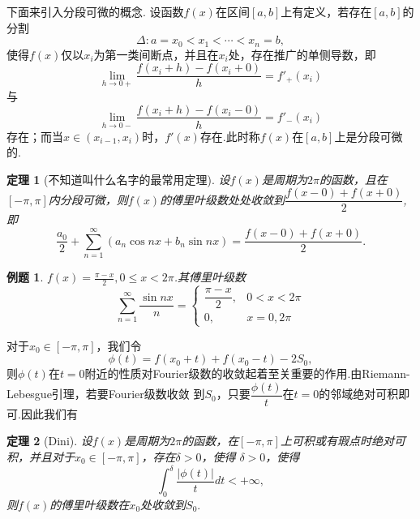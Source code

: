 \documentclass[UTF8]{article}
\newtheorem{thm}{\hspace{2em}定理}[section]
\newtheorem{exa}{\hspace{2em}例题}[section]
\begin{document}
  下面来引入分段可微的概念.
  设函数$f(x)$在区间$[a,b]$上有定义，若存在$[a,b]$的分割
  $$\Delta:a=x_0<x_1<\cdots<x_n=b,$$
  使得$f(x)$仅以$x_i$为第一类间断点，并且在$x_i$处，存在推广的单侧导数，即
  $$\lim_{h\to0+}\frac{f(x_i+h)-f(x_i+0)}{h}=f'_+(x_i)$$与
  $$\lim_{h\to0-}\frac{f(x_i+h)-f(x_i-0)}{h}=f'_-(x_i)$$
  存在；而当$x\in(x_{i-1},x_i)$时，$f'(x)$存在.此时称$f(x)$在$[a,b]$上是分段可微的.
  \begin{thm}[不知道叫什么名字的最常用定理]
    设$f(x)$是周期为$2\pi$的函数，且在$[-\pi,\pi]$内分段可微，则$f(x)$的傅里叶级数处处收敛到$\dfrac{f(x-0)+f(x+0)}{2}$,
    即$$\frac{a_0}{2}+\sum_{n=1}^\infty(a_n\cos nx+b_n\sin nx)=\dfrac{f(x-0)+f(x+0)}{2}.$$
  \end{thm}

  \begin{exa}
    $f(x)=\frac{\pi-x}{2},0\le x<2\pi$.其傅里叶级数
    $$\sum_{n=1}^\infty\frac{\sin nx}{n}=\begin{cases}\dfrac{\pi-x}{2},& 0<x<2\pi\\0,&x=0,2\pi \end{cases}$$
  \end{exa}

  对于$x_0\in[-\pi,\pi]$，我们令
  $$\phi(t)=f(x_0+t)+f(x_0-t)-2S_0,$$
  则$\phi(t)$在$t=0$附近的性质对Fourier级数的收敛起着至关重要的作用.由Riemann-Lebesgue引理，若要Fourier级数收敛
  到$S_0$，只要$\dfrac{\phi(t)}{t}$在$t=0$的邻域绝对可积即可.因此我们有
  \begin{thm}[Dini]
    设$f(x)$是周期为$2\pi$的函数，在$[-\pi,\pi]$上可积或有瑕点时绝对可积，并且对于$x_0\in[-\pi,\pi]$，存在$\delta>0$，使得
    $\delta>0$，使得
    $$\int_0^\delta\frac{|\phi(t)|}{t}dt<+\infty,$$
    则$f(x)$的傅里叶级数在$x_0$处收敛到$S_0.$
  \end{thm}
  \clearpage
\end{document}
